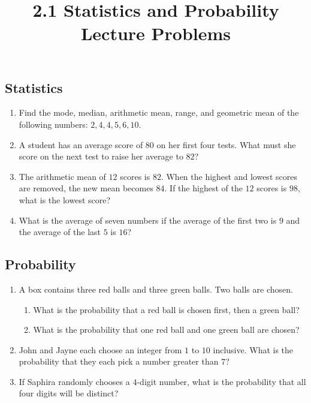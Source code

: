 \documentclass{article}
\title{2.1 Statistics and Probability Lecture Problems}
\author{}
\date{}
\begin{document}
\maketitle

\subsection*{Statistics}
\begin{enumerate}
	\item Find the mode, median, arithmetic mean, range, and geometric mean
		of the following numbers: $2, 4, 4, 5, 6, 10$.
		\vspace{3cm}
	\item A student has an average score of $80$ on her first four tests.
		What must she score on the next test to raise her average to $82$?
		\vspace{3cm}
	\item The arithmetic mean of $12$ scores is $82$. When the highest and
		lowest scores are removed, the new mean becomes $84$. If the highest
		of the $12$ scores is $98$, what is the lowest score?
		\vspace{3cm}
	\item What is the average of seven numbers if the average of the first
		two is $9$ and the average of the last $5$ is $16$?
		\vspace{3cm}
\end{enumerate}

\newpage

\subsection*{Probability}
\begin{enumerate}[resume]
	\item A box contains three red balls and three green balls. Two balls
		are chosen.
		\begin{enumerate}
			\item What is the probability that a red ball is chosen first,
				then a green ball?
				\vspace{3cm}
			\item What is the probability that one red ball and one green
				ball are chosen?
				\vspace{3cm}
		\end{enumerate}
	\item John and Jayne each choose an integer from $1$ to $10$ inclusive.
		What is the probability that they each pick a number greater than
		$7$?
		\vspace{3cm}
	\item If Saphira randomly chooses a $4$-digit number, what is the
		probability that all four digits will be distinct?
\end{enumerate}
\end{document}

